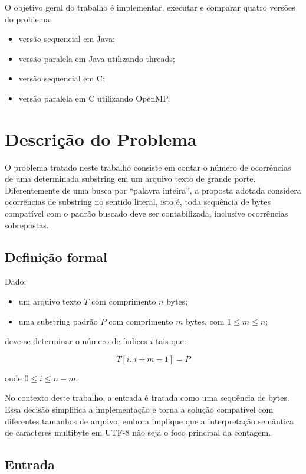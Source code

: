 \documentclass[10pt,twocolumn,a4paper]{article}
\begin{document}
O objetivo geral do trabalho é implementar, executar e comparar quatro versões do problema:

\begin{itemize}[leftmargin=*]
    \item versão sequencial em Java;
    \item versão paralela em Java utilizando threads;
    \item versão sequencial em C;
    \item versão paralela em C utilizando OpenMP.
\end{itemize}

\section{Descrição do Problema}

O problema tratado neste trabalho consiste em contar o número de ocorrências de uma determinada substring em um arquivo texto de grande porte. Diferentemente de uma busca por ``palavra inteira'', a proposta adotada considera ocorrências de substring no sentido literal, isto é, toda sequência de bytes compatível com o padrão buscado deve ser contabilizada, inclusive ocorrências sobrepostas.

\subsection{Definição formal}

Dado:

\begin{itemize}[leftmargin=*]
    \item um arquivo texto $T$ com comprimento $n$ bytes;
    \item uma substring padrão $P$ com comprimento $m$ bytes, com $1 \leq m \leq n$;
\end{itemize}

deve-se determinar o número de índices $i$ tais que:

\[
T[i..i+m-1] = P
\]

onde $0 \leq i \leq n-m$.

No contexto deste trabalho, a entrada é tratada como uma sequência de bytes. Essa decisão simplifica a implementação e torna a solução compatível com diferentes tamanhos de arquivo, embora implique que a interpretação semântica de caracteres multibyte em UTF-8 não seja o foco principal da contagem.

\subsection{Entrada}
\end{document}
